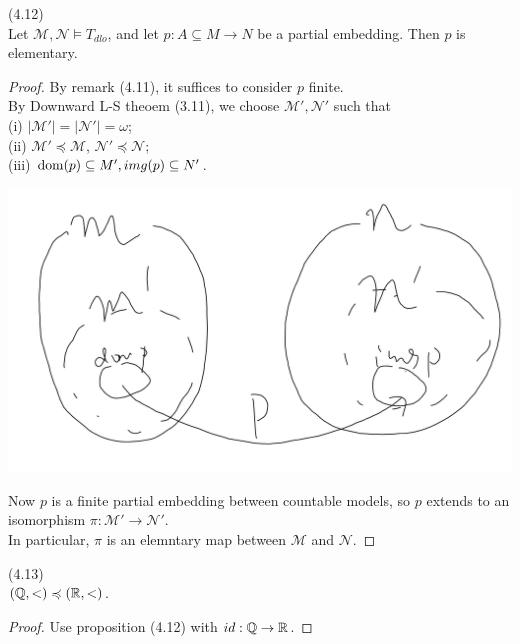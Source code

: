 \documentclass[a4paper]{article}
\begin{document}
\begin{prop} (4.12)\\
    Let $\mathcal{M},\mathcal{N} \vDash T_{dlo}$, and let $p: A \subseteq M \to N$ be a partial embedding. Then $p$ is elementary.\\
    \begin{proof}
        By remark (4.11), it suffices to consider $p$ finite.\\
        By Downward L-S theoem (3.11), we choose $\mathcal{M}',\mathcal{N}'$ such that\\
        (i) $|\mathcal{M}'| = |\mathcal{N}'| = \omega$;\\
        (ii) $\mathcal{M}' \preccurlyeq\mathcal{M}$, $\mathcal{N}' \preccurlyeq\mathcal{N}$;\\
        (iii) $\operatorname{dom} (p) \subseteq M', img(p) \subseteq N'$.

        \includegraphics[scale=0.5]{image/Model_04.png}

        Now $p$ is a finite partial embedding between countable models, so $p$ extends to an isomorphism $\pi:\mathcal{M}' \to \mathcal{N}'$.\\
        In particular, $\pi$ is an elemntary map between $\mathcal{M}$ and $\mathcal{N}$.
    \end{proof}
\end{prop}

\begin{coro} (4.13)\\
    $(\mathbb{Q},<) \preccurlyeq (\mathbb{R},<)$.\\
    \begin{proof}
        Use proposition (4.12) with $id:\mathbb{Q} \to \mathbb{R}$.
    \end{proof}
\end{coro}
\end{document}
